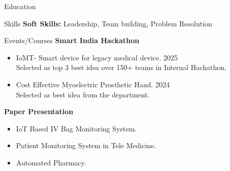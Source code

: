\documentclass{resume}
\begin{document}
\begin{rSection}{Education}
\begin{rSection}{Skills}
{\bf Soft Skills:}  Leadership, Team building, Problem Resolution

\end{rSection}
\end{rSection}


\newpage

\begin{rSection}{Events/Courses}
\smallskip
{\bf Smart India Hackathon}
\begin{itemize}
\item IoMT- Smart device for legacy medical device. \hfill 2025\\
Selected as top 3 best idea over 150+ teams in Internal Hachathon.
\item Cost Effective Myoelectric Prosthetic Hand. \hfill 2024\\
Selected as best idea from the department.
\end{itemize}

\smallskip
{\bf Paper Presentation}
\begin{itemize}
\item IoT Based IV Bag Monitoring System.
\item Patient Monitoring System in Tele Medicine.
\item Automated Pharmacy.
\end{itemize}
\end{rSection}



    

\end{document}
